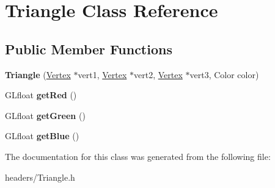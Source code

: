 \hypertarget{class_triangle}{\section{Triangle Class Reference}
\label{class_triangle}
}
\subsection*{Public Member Functions}
\begin{DoxyCompactItemize}
\item 
\hypertarget{class_triangle_adb215b2bea784000c0019a151705c338}{{\bfseries Triangle} (\hyperlink{class_vertex}{Vertex} $\ast$vert1, \hyperlink{class_vertex}{Vertex} $\ast$vert2, \hyperlink{class_vertex}{Vertex} $\ast$vert3, Color color)}\label{class_triangle_adb215b2bea784000c0019a151705c338}

\item 
\hypertarget{class_triangle_a1b6a3b7311623161c7f2ad133133d7dc}{G\+Lfloat {\bfseries get\+Red} ()}\label{class_triangle_a1b6a3b7311623161c7f2ad133133d7dc}

\item 
\hypertarget{class_triangle_add8c8a82c204af4696d8bad944a8129a}{G\+Lfloat {\bfseries get\+Green} ()}\label{class_triangle_add8c8a82c204af4696d8bad944a8129a}

\item 
\hypertarget{class_triangle_a53fb4cd6447160b2ea142c8fdf20e673}{G\+Lfloat {\bfseries get\+Blue} ()}\label{class_triangle_a53fb4cd6447160b2ea142c8fdf20e673}

\end{DoxyCompactItemize}


The documentation for this class was generated from the following file\+:\begin{DoxyCompactItemize}
\item 
headers/Triangle.\+h\end{DoxyCompactItemize}
